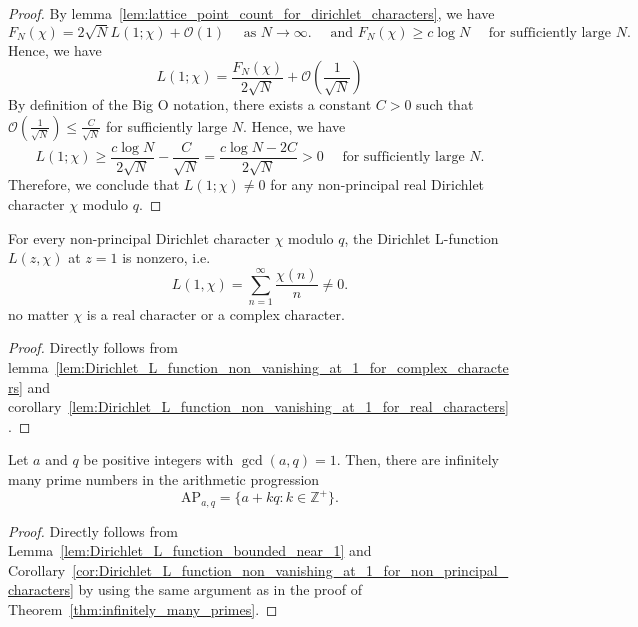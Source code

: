 \documentclass{elegantbook}
\begin{document}
\begin{proof}
  By lemma~\ref{lem:lattice_point_count_for_dirichlet_characters}, we have
  \[
    F_N(\chi) = 2\sqrt{N}L(1;\chi) + \mathcal{O}(1) \quad \text{ as } N \to \infty. \quad \text{ and } F_N(\chi) \geq c \log N \quad \text{ for sufficiently large } N.
  \]
  Hence, we have
  \[
    L(1;\chi) = \frac{F_N(\chi)}{2\sqrt{N}} + \mathcal{O}\left( \frac{1}{\sqrt{N}} \right) 
  \]
  By definition of the Big O notation, there exists a constant \(C > 0\) such that $\mathcal{O}\left( \frac{1}{\sqrt{N}} \right) \leq \frac{C}{\sqrt{N}}$ for sufficiently large \(N\). Hence, we have
  \[
    L(1;\chi) \geq \frac{c \log N}{2\sqrt{N}} - \frac{C}{\sqrt{N}} = \frac{c \log N - 2C}{2\sqrt{N}}>0 \quad \text{ for sufficiently large } N.
  \]
  Therefore, we conclude that \(L(1;\chi) \ne 0\) for any non-principal real Dirichlet character \(\chi\) modulo \(q\).
\end{proof}

\begin{corollary} \label{cor:Dirichlet_L_function_non_vanishing_at_1_for_non_principal_characters}
  For every non-principal Dirichlet character \(\chi\) modulo \(q\), the Dirichlet L-function \(L(z,\chi)\) at \(z=1\) is nonzero, i.e.
  \[
    L(1,\chi) = \sum_{n=1}^{\infty} \frac{\chi(n)}{n} \ne 0.
  \]
  no matter \(\chi\) is a real character or a complex character.
\end{corollary}

\begin{proof}
  Directly follows from lemma~\ref{lem:Dirichlet_L_function_non_vanishing_at_1_for_complex_characters} and corollary~\ref{lem:Dirichlet_L_function_non_vanishing_at_1_for_real_characters}.
\end{proof}

\begin{theorem} \label{thm:PN_in_AP}
  Let \(a\) and \(q\) be positive integers with \(\gcd(a,q)=1\). Then, there are infinitely many prime numbers in the arithmetic progression
  \[
    \mathrm{AP}_{a,q} = \{ a + kq : k \in \mathbb{Z}^+ \}.  
  \]
\end{theorem}

\begin{proof}
  Directly follows from Lemma~\ref{lem:Dirichlet_L_function_bounded_near_1} and Corollary~\ref{cor:Dirichlet_L_function_non_vanishing_at_1_for_non_principal_characters} by using the same argument as in the proof of Theorem~\ref{thm:infinitely_many_primes}.
\end{proof}
\end{document}

